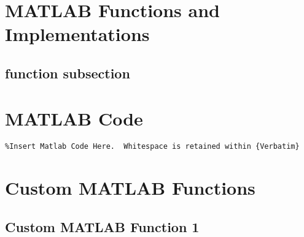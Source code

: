 \documentclass[11pt]{article}
\begin{document}
\begin{appendices}

\section{MATLAB Functions and Implementations}

\subsection*{function subsection}

\section{MATLAB Code}
\begin{verbatim}
%Insert Matlab Code Here.  Whitespace is retained within {Verbatim}

\end{verbatim}

\section{Custom MATLAB Functions} 	%

\subsection*{Custom MATLAB Function 1}


\end{appendices}
\end{document}
